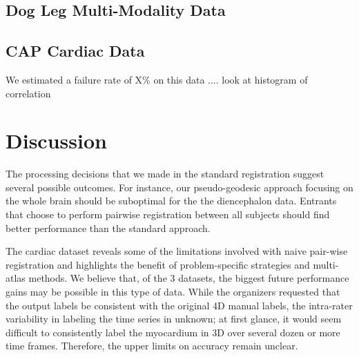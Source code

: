 \documentclass{llncs}
\begin{document}
\subsection{Dog Leg Multi-Modality Data}

\subsection{CAP Cardiac Data}
We estimated a failure rate of X\% on this data  .... look at
histogram of correlation 

\section{Discussion} The processing decisions that we made in the
standard registration suggest several possible outcomes.  For
instance, our pseudo-geodesic approach focusing on the whole brain
should be suboptimal for the the diencephalon data. Entrants that
choose to perform pairwise registration between all subjects should
find better performance than the standard approach.

The cardiac dataset reveals some of the limitations involved with
naive pair-wise registration and highlights the benefit of
problem-specific strategies and multi-atlas methods.  We believe that,
of the 3 datasets, the biggest future performance gains may be
possible in this type of data.  While the organizers requested that
the output labels be consistent with the original 4D manual labels,
the intra-rater variability in labeling the time series in unknown; at
first glance, it would seem difficult to consistently label the
myocardium in 3D over several dozen or more time frames.  Therefore,
the upper limits on accuracy remain unclear.



\end{document}
